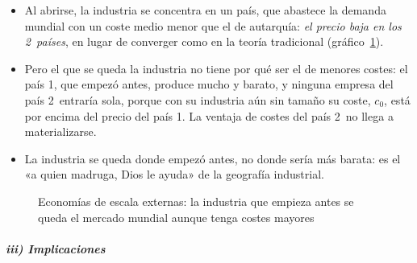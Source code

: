 \documentclass[11pt]{article}
\begin{document}
\begin{itemize}
\item Al abrirse, la industria se concentra en un país, que abastece la demanda mundial con un coste medio menor que el de autarquía: \emph{el precio baja en los 2~países}, en lugar de converger como en la teoría tradicional (gráfico~\ref{fig:economias-externas}).
\item Pero el que se queda la industria no tiene por qué ser el de menores costes: el país 1, que empezó antes, produce mucho y barato, y ninguna empresa del país 2~entraría sola, porque con su industria aún sin tamaño su coste, $c_0$, está por encima del precio del país 1. La ventaja de costes del país 2~no llega a materializarse.
\item La industria se queda donde empezó antes, no donde sería más barata: es el «a quien madruga, Dios le ayuda» de la geografía industrial.
\end{itemize}

\begin{figure}[H]
\centering
\caption{Economías de escala externas: la industria que empieza antes se queda el mercado mundial aunque tenga costes mayores}\label{fig:economias-externas}
\end{figure}

\subparagraph{iii) Implicaciones}
\end{document}

